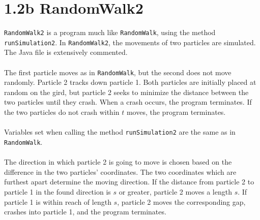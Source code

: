 \section*{1.2b RandomWalk2}

\texttt{RandomWalk2} is a program much like \texttt{RandomWalk}, using the method \texttt{runSimulation2}. In \texttt{RandomWalk2}, the movements of two particles are simulated. The Java file is extensively commented. \\
\\
The first particle moves as in \texttt{RandomWalk}, but the second does not move randomly. Particle 2 tracks down particle 1. Both particles are initially placed at random on the gird, but particle 2 seeks to minimize the distance between the two particles until they crash. When a crash occurs, the program terminates. If the two particles do not crash within $t$ moves, the program terminates. \\
\\
Variables set when calling the method \texttt{runSimulation2} are the same as in \texttt{RandomWalk}.\\
\\
The direction in which particle 2 is going to move is chosen based on the difference in the two particles' coordinates. The two coordinates which are furthest apart determine the moving direction. If the distance from particle 2 to particle 1 in the found direction is $s$ or greater, particle 2 moves a length $s$. If particle 1 is within reach of length $s$, particle 2 moves the corresponding gap, crashes into particle 1, and the program terminates.